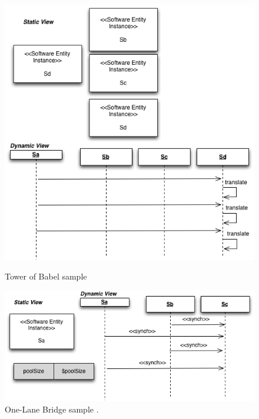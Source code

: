 \documentclass[times]{stvrauth}
\begin{document}
\begin{figure}[h]
\begin{minipage}{.5\textwidth}
\centering
\includegraphics[width=1\textwidth]{./images/babel2.png}
\caption{Tower of Babel sample \cite{Vetoio2011}}
\label{fig:babel}
\end{minipage}
\begin{minipage}{.5\textwidth}
\centering
\includegraphics[width=1\textwidth]{./images/onelane.png}
\caption{One-Lane Bridge sample \cite{Vetoio2011}.}
\label{fig:onelane}
\end{minipage}
\end{figure}
\end{document}
